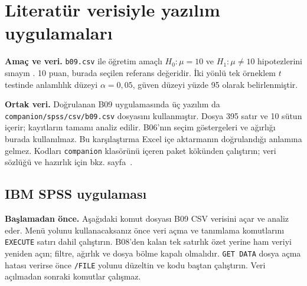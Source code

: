 \section{Literatür verisiyle yazılım uygulamaları}
\label{sec:spss-b09}

\textbf{Amaç ve veri.} \texttt{b09.csv} ile öğretim amaçlı
$H_0:\mu=10$ ve $H_1:\mu\ne10$ hipotezlerini sınayın
\citep{cortez2008data}. 10 puan, burada seçilen referans değeridir.
İki yönlü tek örneklem $t$ testinde anlamlılık düzeyi $\alpha=0{,}05$,
güven düzeyi yüzde 95 olarak belirlenmiştir.


\textbf{Ortak veri.} Doğrulanan B09 uygulamasında üç yazılım da
\nolinkurl{companion/spss/csv/b09.csv} dosyasını kullanmıştır. Dosya
395 satır ve 10 sütun içerir; kayıtların tamamı analiz edilir.
B06'nın seçim göstergeleri ve ağırlığı burada kullanılmaz.
Bu karşılaştırma Excel içe aktarmanın doğrulandığı anlamına gelmez.
Kodları \texttt{companion} klasörünü içeren paket kökünden çalıştırın;
veri sözlüğü ve hazırlık için bkz. sayfa~\pageref{sec:spss-guide}.

\subsection{IBM SPSS uygulaması}
\textbf{Başlamadan önce.} Aşağıdaki komut dosyası B09 CSV verisini
açar ve analiz eder. Menü yolunu kullanacaksanız önce veri açma ve
tanımlama komutlarını \texttt{EXECUTE} satırı dahil çalıştırın.
B08'den kalan tek satırlık özet yerine ham veriyi yeniden açın;
filtre, ağırlık ve dosya bölme kapalı olmalıdır. \texttt{GET DATA}
dosya açma hatası verirse önce \texttt{/FILE} yolunu düzeltin ve
kodu baştan çalıştırın. Veri açılmadan sonraki komutlar çalışmaz.

\begin{spssadimlar}
\end{spssadimlar}

